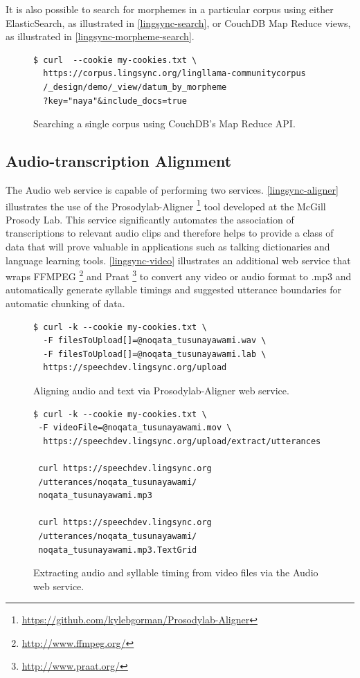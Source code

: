 \documentclass[11pt]{article}
\begin{document}
It is also possible to search for morphemes in a particular corpus using either
ElasticSearch, as illustrated in \autoref{lingsync-search}, or CouchDB Map
Reduce views, as illustrated in \autoref{lingsync-morpheme-search}.

\begin{figure}[h]
\scriptsize
\begin{verbatim}
$ curl  --cookie my-cookies.txt \
  https://corpus.lingsync.org/lingllama-communitycorpus
  /_design/demo/_view/datum_by_morpheme
  ?key="naya"&include_docs=true
\end{verbatim}
\normalsize
\caption{Searching a single corpus using CouchDB's Map Reduce API.}
\label{lingsync-morpheme-search}
\end{figure}




\subsection{Audio-transcription Alignment}
The Audio web service is capable of performing two services.
\autoref{lingsync-aligner} illustrates the use of the
Prosodylab-Aligner%
\footnote{\url{https://github.com/kylebgorman/Prosodylab-Aligner}} %
tool developed at the McGill Prosody Lab. This service significantly automates
the association of transcriptions to relevant audio clips and therefore helps
to provide a class of data that will prove valuable in applications such as
talking dictionaries and language learning tools. \autoref{lingsync-video}
illustrates an additional web service that wraps
FFMPEG%
\footnote{\url{http://www.ffmpeg.org/}} %
and Praat%
\footnote{\url{http://www.praat.org/}} %
to convert any video or audio format to .mp3 and automatically generate
syllable timings and suggested utterance boundaries for automatic chunking of
data.


\begin{figure}[h]
\scriptsize
\begin{verbatim}
$ curl -k --cookie my-cookies.txt \
  -F filesToUpload[]=@noqata_tusunayawami.wav \
  -F filesToUpload[]=@noqata_tusunayawami.lab \
  https://speechdev.lingsync.org/upload

\end{verbatim}
\normalsize
\caption{Aligning audio and text via Prosodylab-Aligner web service.}
\label{lingsync-aligner}
\end{figure}



\begin{figure}[h]
\scriptsize
\begin{verbatim}
$ curl -k --cookie my-cookies.txt \
 -F videoFile=@noqata_tusunayawami.mov \
  https://speechdev.lingsync.org/upload/extract/utterances
  
 curl https://speechdev.lingsync.org
 /utterances/noqata_tusunayawami/
 noqata_tusunayawami.mp3 
 
 curl https://speechdev.lingsync.org
 /utterances/noqata_tusunayawami/
 noqata_tusunayawami.mp3.TextGrid
\end{verbatim}
\normalsize
\caption{Extracting audio and syllable timing from video files via the Audio web service.}
\label{lingsync-video}
\end{figure}
\end{document}
